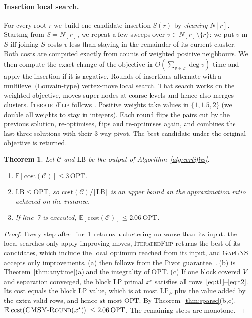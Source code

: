 \documentclass[11pt]{article}
\newtheorem{theorem}{Theorem}
\theoremstyle{definition}
\newcommand{\OPT}{\mathrm{OPT}}
\newcommand{\cost}{\mathrm{cost}}
\newcommand{\LB}{\mathrm{LB}}
\begin{document}
\paragraph{Insertion local search.}  For every root $r$ we build one candidate
insertion $S(r)$ by \emph{cleaning} $N[r]$.  Starting from $S=N[r]$, we
repeat a few sweeps over $v\in N[r]\setminus\{r\}$: we put $v$ in $S$ iff
joining $S$ costs $v$ less than staying in the remainder of its current
cluster.  Both costs are computed exactly from counts of weighted positive
neighbours.  We then compute the exact change of the objective in
$O(\sum_{v\in S}\deg v)$ time and apply the insertion if it is negative.
Rounds of insertions alternate with a multilevel (Louvain-type) vertex-move
local search.  That search works on the weighted objective, moves super nodes
at coarse levels and hence also merges clusters.  \textsc{IteratedFlip}
follows \citet{CohenAddadLPTYZ24}.  Positive weights take values in
$\{1,1.5,2\}$ (we double all weights to stay in integers).  Each round flips
the pairs cut by the previous solution, re-optimises, flips and re-optimises
again, and combines the last three solutions with their $3$-way pivot.  The
best candidate under the original objective is returned.

\begin{theorem}\label{thm:certiflip}
Let $\mathcal C$ and $\LB$ be the output of Algorithm~\ref{alg:certiflip}.
\begin{enumerate}
\item[(a)] $\mathbb E[\cost(\mathcal C)]\le3\,\OPT$.
\item[(b)] $\LB\le\OPT$, so $\cost(\mathcal C)/\lceil\LB\rceil$ is an upper
bound on the approximation ratio achieved on the instance.
\item[(c)] If line~7 is executed, $\mathbb E[\cost(\mathcal C)]\le 2.06\,\OPT$.
\end{enumerate}
\end{theorem}
\begin{proof}
Every step after line~1 returns a clustering no worse than its input: the
local searches only apply improving moves, \textsc{IteratedFlip} returns the
best of its candidates, which include the local optimum reached from its input,
and \textsc{GapLNS} accepts only improvements.  (a) then follows from the
Pivot guarantee~\citep{AilonCN08}.  (b) is Theorem~\ref{thm:anytime}(a) and
the integrality of $\OPT$.  (c) If one block covered $V$ and separation
converged, the block LP primal $x^\star$ satisfies all
rows~\eqref{eq:t1}--\eqref{eq:t2}.  Its cost equals the block LP value, which
is at most $\mathrm{LP}_P$ plus the value added by the extra valid rows, and
hence at most $\OPT$.  By Theorem~\ref{thm:sparse}(b,c),
$\mathbb E[\cost(\textsc{CMSY-Round}(x^\star))]\le 2.06\,\OPT$.  The remaining
steps are monotone.
\end{proof}
\end{document}
